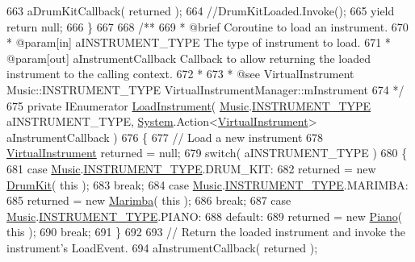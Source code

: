 \begin{DoxyCodeInclude}
663         aDrumKitCallback( returned );
664         \textcolor{comment}{//DrumKitLoaded.Invoke();}
665         yield \textcolor{keywordflow}{return} null;
666     \}
667 \textcolor{comment}{}
668 \textcolor{comment}{    /** }
669 \textcolor{comment}{     * @brief Coroutine to load an instrument. }
670 \textcolor{comment}{     * @param[in] aINSTRUMENT\_TYPE The type of instrument to load. }
671 \textcolor{comment}{     * @param[out] aInstrumentCallback Callback to allow returning the loaded instrument to the calling
       context.}
672 \textcolor{comment}{     * }
673 \textcolor{comment}{     * @see VirtualInstrument Music::INSTRUMENT\_TYPE VirtualInstrumentManager::mInstrument}
674 \textcolor{comment}{    */}
675     \textcolor{keyword}{private} IEnumerator \hyperlink{group___v_i_m_coroutines_gab8082c1cc590771bf57da8b5ae8603d1}{LoadInstrument}( \hyperlink{class_music}{Music}.\hyperlink{group___music_enums_gabfce60192305965558a36e368ebd67c3}{INSTRUMENT\_TYPE} 
      aINSTRUMENT\_TYPE, \hyperlink{namespace_system}{System}.Action<\hyperlink{class_virtual_instrument}{VirtualInstrument}> aInstrumentCallback )
676     \{
677         \textcolor{comment}{// Load a new instrument}
678         \hyperlink{class_virtual_instrument}{VirtualInstrument} returned = null;
679         \textcolor{keywordflow}{switch}( aINSTRUMENT\_TYPE )
680         \{
681             \textcolor{keywordflow}{case} \hyperlink{class_music}{Music}.\hyperlink{group___music_enums_gabfce60192305965558a36e368ebd67c3}{INSTRUMENT\_TYPE}.DRUM\_KIT:
682                 returned = \textcolor{keyword}{new} \hyperlink{class_drum_kit}{DrumKit}( \textcolor{keyword}{this} );
683                 \textcolor{keywordflow}{break};
684             \textcolor{keywordflow}{case} \hyperlink{class_music}{Music}.\hyperlink{group___music_enums_gabfce60192305965558a36e368ebd67c3}{INSTRUMENT\_TYPE}.MARIMBA:
685                 returned = \textcolor{keyword}{new} \hyperlink{class_marimba}{Marimba}( \textcolor{keyword}{this} );
686                 \textcolor{keywordflow}{break};
687             \textcolor{keywordflow}{case} \hyperlink{class_music}{Music}.\hyperlink{group___music_enums_gabfce60192305965558a36e368ebd67c3}{INSTRUMENT\_TYPE}.PIANO:
688             \textcolor{keywordflow}{default}:
689                 returned = \textcolor{keyword}{new} \hyperlink{class_piano}{Piano}( \textcolor{keyword}{this} );
690                 \textcolor{keywordflow}{break};
691         \}
692 
693         \textcolor{comment}{// Return the loaded instrument and invoke the instrument's LoadEvent.}
694         aInstrumentCallback( returned );

\end{DoxyCodeInclude}
